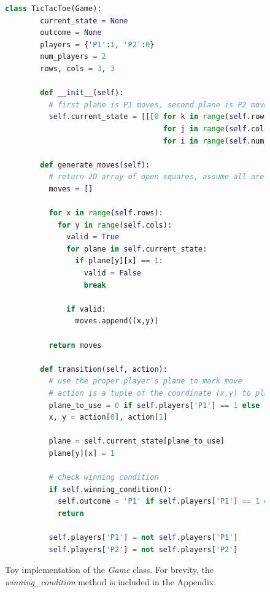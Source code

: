 \documentclass{article}
\begin{document}
  \begin{figure}[H]
    \lstset{basicstyle=\tiny}
    \begin{lstlisting}[language=Python]
      class TicTacToe(Game):
        current_state = None
        outcome = None
        players = {'P1':1, 'P2':0}
        num_players = 2
        rows, cols = 3, 3

        def __init__(self):
          # first plane is P1 moves, second plane is P2 moves
          self.current_state = [[[0 for k in range(self.rows)] 
                                    for j in range(self.cols)] 
                                    for i in range(self.num_players)]

        def generate_moves(self):
          # return 2D array of open squares, assume all are open. 0=closed, 1=open
          moves = []

          for x in range(self.rows):
            for y in range(self.cols):
              valid = True
              for plane in self.current_state:
                if plane[y][x] == 1:
                  valid = False
                  break
              
              if valid:  
                moves.append((x,y))

          return moves

        def transition(self, action):
          # use the proper player's plane to mark move
          # action is a tuple of the coordinate (x,y) to play
          plane_to_use = 0 if self.players['P1'] == 1 else 1
          x, y = action[0], action[1]

          plane = self.current_state[plane_to_use]
          plane[y][x] = 1

          # check winning condition
          if self.winning_condition():
            self.outcome = 'P1' if self.players['P1'] == 1 else 'P2'
            return

          self.players['P1'] = not self.players['P1']
          self.players['P2'] = not self.players['P2']

    \end{lstlisting}
    \caption[Toy implementation of the \textit{Game} class]{Toy implementation of the \textit{Game} class. For brevity, the \textit{winning\_condition} method is included in the Appendix.}
  \end{figure}
\end{document}
